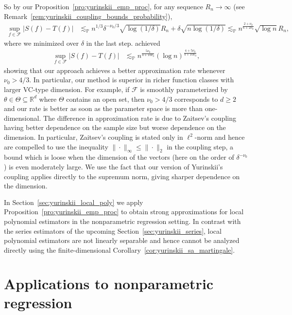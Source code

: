 \documentclass[11pt,lof]{puthesis}
\renewcommand{\P}{\ensuremath{\mathbb{P}}}
\newcommand{\R}{\ensuremath{\mathbb{R}}}
\newcommand{\cF}{\ensuremath{\mathcal{F}}}
\theoremstyle{break}
\theoremstyle{proof}
\begin{document}
So by our Proposition~\ref{pro:yurinskii_emp_proc},
for any sequence $R_n \to \infty$
(see Remark~\ref{rem:yurinskii_coupling_bounds_probability}),
%
\begin{align*}
  \sup_{f \in \cF}
  \big| S(f) - T(f) \big|
  &\lesssim_\P
  n^{1/3} \delta^{-\nu_0/3}
  \sqrt{\log(1/\delta)} R_n
  + \delta \sqrt{n\log(1/\delta)}
  \lesssim_\P
  n^{\frac{2+\nu_0}{6+2\nu_0}}
  \sqrt{\log n} R_n,
\end{align*}
%
where we minimized over $\delta$ in the last step.
\citet[Proposition~1]{berthet2006revisiting} achieved
%
\begin{align*}
  \sup_{f \in \cF}
  \big| S(f) - T(f) \big|
  &\lesssim_\P
  n^{\frac{5\nu_0}{4+10\nu_0}}
  (\log n)^{\frac{4+5\nu_0}{4+10\nu_0}},
\end{align*}
%
showing that our approach achieves a better approximation rate whenever
$\nu_0 > 4/3$. In particular, our method is superior in richer function classes
with larger VC-type dimension. For example, if $\cF$ is smoothly parameterized
by $\theta \in \Theta \subseteq \R^d$ where $\Theta$ contains an open set, then
$\nu_0 > 4/3$ corresponds to $d \geq 2$ and our rate is better as soon as the
parameter space is more than one-dimensional. The difference in approximation
rate is due to Zaitsev's coupling having better dependence on the sample size
but worse dependence on the dimension. In particular, Zaitsev's coupling is
stated only in $\ell^2$-norm and hence
\citet[Equation~5.3]{berthet2006revisiting} are compelled to use the inequality
$\|\cdot\|_\infty \leq \|\cdot\|_2$ in the coupling step, a bound which is
loose when the dimension of the vectors (here on the order of
$\delta^{-\nu_0}$) is even moderately large. We use the fact that our version
of Yurinskii's coupling applies directly to the supremum norm, giving sharper
dependence on the dimension.

In Section~\ref{sec:yurinskii_local_poly} we apply
Proposition~\ref{pro:yurinskii_emp_proc} to
obtain strong approximations for local polynomial estimators in the
nonparametric regression setting. In contrast with the series estimators of the
upcoming Section~\ref{sec:yurinskii_series}, local polynomial estimators are
not linearly
separable and hence cannot be analyzed directly using the finite-dimensional
Corollary~\ref{cor:yurinskii_sa_martingale}.

\section{Applications to nonparametric regression}
\label{sec:yurinskii_nonparametric}
\end{document}
